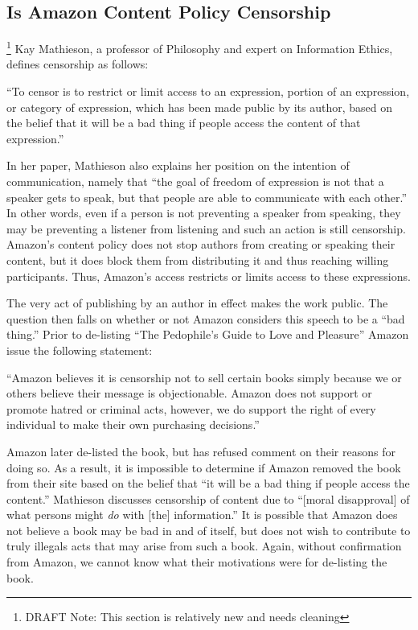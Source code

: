 \documentclass[11pt]{article}
\begin{document}
\begin{multicols}{2}
\subsection{Is Amazon Content Policy Censorship} \footnote{DRAFT Note: This section is relatively new and needs cleaning}
Kay Mathieson, a professor of Philosophy and expert on Information Ethics, defines censorship as follows:

``To censor is to restrict or limit access to an expression, portion of an expression, or category of expression, which has been made public by its author, based on the belief that it will be a bad thing if people access the content of that expression.'' \cite{MathiesenCensorship}

In her paper, Mathieson also explains her position on the intention of communication, namely that ``the goal of freedom of expression is not that a speaker gets to speak, but that people are able to communicate with each other.''  In other words, even if a person is not preventing a speaker from speaking, they may be preventing a listener from listening and such an action is still censorship.  Amazon's content policy does not stop authors from creating or speaking their content, but it does block them from distributing it and thus reaching willing participants.  Thus, Amazon's access restricts or limits access to these expressions.

The very act of publishing by an author in effect makes the work public.  The question then falls on whether or not Amazon considers this speech to be a ``bad thing.''  Prior to de-listing ``The Pedophile's Guide to Love and Pleasure'' Amazon issue the following statement:

``Amazon believes it is censorship not to sell certain books simply because we or others believe their message is objectionable.  Amazon does not support or promote hatred or criminal acts, however, we do support the right of every individual to make their own purchasing decisions.'' \cite{TechCrunchAmazonCensorship}

Amazon later de-listed the book, but has refused comment on their reasons for doing so.  As a result, it is impossible to determine if Amazon removed the book from their site based on the belief that ``it will be a bad thing if people access the content.''  Mathieson discusses censorship of content due to ``[moral disapproval] of what persons might \emph{do} with [the] information.'' \cite{MathiesenCensorship}  It is possible that Amazon does not believe a book may be bad in and of itself, but does not wish to contribute to truly illegals acts that may arise from such a book.  Again, without confirmation from Amazon, we cannot know what their motivations were for de-listing the book.


\end{multicols}
\end{document}
